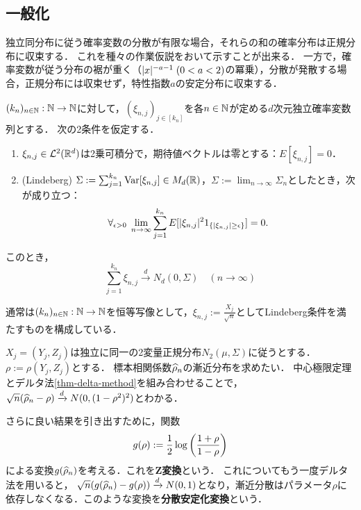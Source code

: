 \documentclass[uplatex,dvipdfmx]{jsreport}
\begin{document}
\subsection{一般化}

\begin{tcolorbox}[colframe=ForestGreen, colback=ForestGreen!10!white,breakable,colbacktitle=ForestGreen!40!white,coltitle=black,fonttitle=\bfseries\sffamily,
title=]
    独立同分布に従う確率変数の分散が有限な場合，それらの和の確率分布は正規分布に収束する．
    これを種々の作業仮説をおいて示すことが出来る．
    一方で，確率変数が従う分布の裾が重く（$\lvert x\rvert^{-a-1}\;(0<a<2)$の冪乗），分散が発散する場合，正規分布には収束せず，特性指数$a$の安定分布に収束する．
\end{tcolorbox}

\begin{theorem}
    $(k_n)_{n\in\mathbb{N}}:\mathbb{N}\to\mathbb{N}$に対して，$(\xi_{n,j})_{j\in[k_n]}$を各$n\in\mathbb{N}$が定める$d$次元独立確率変数列とする．
    次の2条件を仮定する．
    \begin{enumerate}[({A}1)]
        \item $\xi_{n,j}\in\mathcal{L}^2(\mathbb{R}^d)$は2乗可積分で，期待値ベクトルは零とする：$E[\xi_{n,j}]=0$．
        \item (Lindeberg) $\Sigma:=\sum^{k_n}_{j=1}\mathrm{Var}[\xi_{n,j}]\in M_d(\mathbb{R})$，$\Sigma:=\lim_{n\to\infty}\Sigma_n$としたとき，次が成り立つ：
        \[\forall_{\epsilon>0}\;\lim_{n\to\infty}\sum^{k_n}_{j=1}E[\lvert\xi_{n,j}\rvert^21_{\left\{\lvert\xi_{n,j}\rvert\ge\epsilon\right\}}]=0.\]
    \end{enumerate}
    このとき，
    \[\sum^{k_n}_{j=1}\xi_{n,j}\xrightarrow{d}N_d(0,\Sigma)\quad(n\to\infty)\]
\end{theorem}
\begin{remarks}
    通常は$(k_n)_{n\in\mathbb{N}}:\mathbb{N}\to\mathbb{N}$を恒等写像として，$\xi_{n,j}:=\frac{X_j}{\sqrt{n}}$としてLindeberg条件を満たすものを構成している．
\end{remarks}

\begin{example}
    $X_j=(Y_j,Z_j)$は独立に同一の2変量正規分布$N_2(\mu,\Sigma)$に従うとする．$\rho:=\rho(Y_j,Z_j)$とする．
    標本相関係数$\widehat{\rho}_n$の漸近分布を求めたい．
    中心極限定理とデルタ法\ref{thm-delta-method}を組み合わせることで，
    $\sqrt{n}(\widehat{\rho}_n-\rho)\xrightarrow{d}N(0,(1-\rho^2)^2)$とわかる．

    さらに良い結果を引き出すために，関数
    \[g(\rho):=\frac{1}{2}\log\left(\frac{1+\rho}{1-\rho}\right)\]
    による変換$g(\widehat{\rho}_n)$を考える．これを\textbf{Z変換}という．
    これについてもう一度デルタ法を用いると，
    $\sqrt{n}(g(\widehat{\rho}_n)-g(\rho))\xrightarrow{d}N(0,1)$となり，漸近分散はパラメータ$\rho$に依存しなくなる．このような変換を\textbf{分散安定化変換}という．
\end{example}
\end{document}
